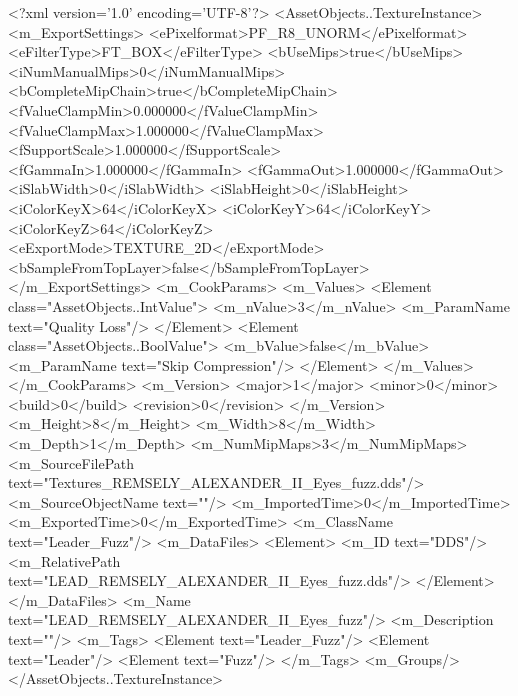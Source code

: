 <?xml version='1.0' encoding='UTF-8'?>
<AssetObjects..TextureInstance>
  <m_ExportSettings>
    <ePixelformat>PF_R8_UNORM</ePixelformat>
    <eFilterType>FT_BOX</eFilterType>
    <bUseMips>true</bUseMips>
    <iNumManualMips>0</iNumManualMips>
    <bCompleteMipChain>true</bCompleteMipChain>
    <fValueClampMin>0.000000</fValueClampMin>
    <fValueClampMax>1.000000</fValueClampMax>
    <fSupportScale>1.000000</fSupportScale>
    <fGammaIn>1.000000</fGammaIn>
    <fGammaOut>1.000000</fGammaOut>
    <iSlabWidth>0</iSlabWidth>
    <iSlabHeight>0</iSlabHeight>
    <iColorKeyX>64</iColorKeyX>
    <iColorKeyY>64</iColorKeyY>
    <iColorKeyZ>64</iColorKeyZ>
    <eExportMode>TEXTURE_2D</eExportMode>
    <bSampleFromTopLayer>false</bSampleFromTopLayer>
  </m_ExportSettings>
  <m_CookParams>
    <m_Values>
      <Element class="AssetObjects..IntValue">
        <m_nValue>3</m_nValue>
        <m_ParamName text="Quality Loss"/>
      </Element>
      <Element class="AssetObjects..BoolValue">
        <m_bValue>false</m_bValue>
        <m_ParamName text="Skip Compression"/>
      </Element>
    </m_Values>
  </m_CookParams>
  <m_Version>
    <major>1</major>
    <minor>0</minor>
    <build>0</build>
    <revision>0</revision>
  </m_Version>
  <m_Height>8</m_Height>
  <m_Width>8</m_Width>
  <m_Depth>1</m_Depth>
  <m_NumMipMaps>3</m_NumMipMaps>
  <m_SourceFilePath text="Textures\LEAD_REMSELY_ALEXANDER_II_Eyes_fuzz.dds"/>
  <m_SourceObjectName text=""/>
  <m_ImportedTime>0</m_ImportedTime>
  <m_ExportedTime>0</m_ExportedTime>
  <m_ClassName text="Leader_Fuzz"/>
  <m_DataFiles>
    <Element>
      <m_ID text="DDS"/>
      <m_RelativePath text="LEAD_REMSELY_ALEXANDER_II_Eyes_fuzz.dds"/>
    </Element>
  </m_DataFiles>
  <m_Name text="LEAD_REMSELY_ALEXANDER_II_Eyes_fuzz"/>
  <m_Description text=""/>
  <m_Tags>
    <Element text="Leader_Fuzz"/>
    <Element text="Leader"/>
    <Element text="Fuzz"/>
  </m_Tags>
  <m_Groups/>
</AssetObjects..TextureInstance>
